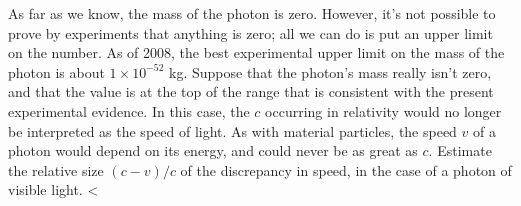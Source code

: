 As far as we know, the mass of the photon is zero. However, it's not possible to prove by experiments that
anything is zero; all we can do is put an upper limit on the number. As of 2008, the best experimental upper limit on
the mass of the photon is about $1\times 10^{-52}$ kg. Suppose that the photon's mass really isn't zero, and that
the value is at the top of the range that is consistent with the present experimental evidence.
In this case, the $c$ occurring in relativity would no longer be interpreted as the speed of light.
As with material particles, the speed $v$ of a photon would depend on its
energy, and could never be as great as $c$. Estimate the relative size $(c-v)/c$ of the discrepancy in speed,
in the case of a photon of visible light.
<%

